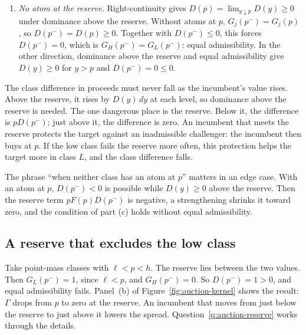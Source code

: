 \begin{derivation}
\begin{enumerate}[label=\textit{Step \arabic*.},leftmargin=*,itemsep=0.6em]
\begin{align*}
\end{align*}
The mixture scales the difference by a positive factor and keeps its sign.
\item \emph{No atom at the reserve.} Right-continuity gives \(D(p)=\lim_{y\downarrow p}D(y)\ge0\) under
dominance above the reserve. Without atoms at \(p\), \(G_j(p^-)=G_j(p)\), so \(D(p^-)=D(p)\ge0\). Together with
\(D(p^-)\le0\), this forces \(D(p^-)=0\), which is \(G_H(p^-)=G_L(p^-)\): equal admissibility. In the other
direction, dominance above the reserve and equal admissibility give \(D(y)\ge0\) for \(y>p\) and \(D(p^-)=0\le0\).
\end{enumerate}
\end{derivation}

\begin{intuition}[part (c)]
The class difference in proceeds must never fall as the incumbent's value rises. Above the reserve, it rises by
\(D(y)\,dy\) at each level, so dominance above the reserve is needed. The one dangerous place is the reserve. Below
it, the difference is \(pD(p^-)\); just above it, the difference is zero. An incumbent that meets the reserve
protects the target against an inadmissible challenger: the incumbent then buys at \(p\). If the low class fails
the reserve more often, this protection helps the target more in class \(L\), and the class difference falls.
\end{intuition}

\begin{watchout}
The phrase ``when neither class has an atom at \(p\)'' matters in an edge case. With an atom at \(p\),
\(D(p^-)<0\) is possible while \(D(y)\ge0\) above the reserve. Then the reserve term \(pF(p)D(p^-)\) is negative,
a strengthening shrinks it toward zero, and the condition of part (c) holds without equal admissibility.
\end{watchout}

\subsection*{A reserve that excludes the low class}

Take point-mass classes with \(\ell<p<h\). The reserve lies between the two values. Then
\(G_L(p^-)=1\), since \(\ell<p\), and \(G_H(p^-)=0\). So \(D(p^-)=1>0\), and equal admissibility fails. Panel~(b)
of Figure~\ref{fig:auction-kernel} shows the result: \(\Gamma\) drops from \(p\) to zero at the reserve. An
incumbent that moves from just below the reserve to just above it lowers the spread. Question~\ref{q:auction-reserve}
works through the details.


